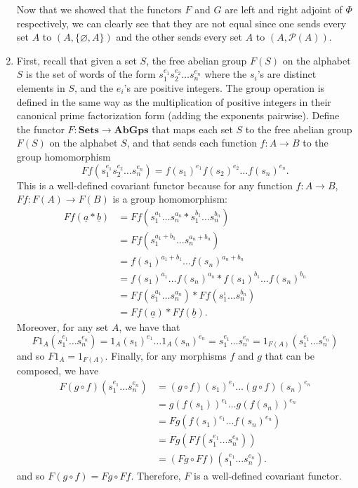 \documentclass{article}
\newcommand{\CatSets}{\textbf{Sets}}
\newcommand{\CatAbGps}{\textbf{AbGps}}
\begin{document}
\begin{enumerate}[label=(\alph*)]
    Now that we showed that the functors $F$ and $G$ are left and right adjoint of $\Phi$ respectively, we can clearly see that they are not equal since one sends every set $A$ to $(A, \{\varnothing, A\})$ and the other sends every set $A$ to $(A, \mathcal{P}(A))$.
    \item First, recall that given a set $S$, the free abelian group $F(S)$ on the alphabet $S$ is the set of words of the form $s_1^{e_1}s_2^{e_2}\dots s_n^{e_n}$ where the $s_i$'s are distinct elements in $S$, and the $e_i$'s are positive integers. The group operation is defined in the same way as the multiplication of positive integers in their canonical prime factorization form (adding the exponents pairwise). Define the functor $F : \CatSets \to \CatAbGps$ that maps each set $S$ to the free abelian group $F(S)$ on the alphabet $S$, and that sends each function $f : A \to B$ to the group homomorphism
    $$Ff(s_1^{e_1}s_2^{e_2}\dots s_n^{e_n}) = f(s_1)^{e_1}f(s_2)^{e_2}\dots f(s_n)^{e_n}.$$
    This is a well-defined covariant functor because for any function $f : A \to B$, $Ff : F(A) \to F(B)$ is a group homomorphism:
    \begin{align*}
        Ff(\underline{a}*\underline{b}) &= Ff(s_1^{a_1}\dots s_n^{a_n} * s_1^{b_1}\dots s_n^{b_n}) \\
        &= Ff(s_1^{a_1 + b_1}\dots s_n^{a_n + b_n}) \\
        &= f(s_1)^{a_1 + b_1}\dots f(s_n)^{a_n + b_n} \\
        &= f(s_1)^{a_1}\dots f(s_n)^{a_n} * f(s_1)^{b_1}\dots f(s_n)^{b_n} \\
        &= Ff(s_1^{a_1}\dots s_n^{a_n})*Ff(s_1^{ _1}\dots s_n^{b_n}) \\
        &= Ff(\underline{a})* Ff(\underline{b}).
    \end{align*}
    Moreover, for any set $A$, we have that
    $$F1_A(s_1^{e_1}\dots s_n^{e_n}) = 1_A(s_1)^{e_1}\dots 1_A(s_n)^{e_n} = s_1^{e_1}\dots s_n^{e_n} = 1_{F(A)}(s_1^{e_1}\dots s_n^{e_n})$$
    and so $F1_A = 1_{F(A)}$. Finally, for any morphisms $f$ and $g$ that can be composed, we have 
    \begin{align*}
        F(g \circ f)(s_1^{e_1}\dots s_n^{e_n}) &= (g \circ f)(s_1)^{e_1}\dots (g \circ f)(s_n)^{e_n} \\
        &= g(f(s_1))^{e_1}\dots g(f(s_n))^{e_n} \\
        &= Fg(f(s_1)^{e_1}\dots f(s_n)^{e_n}) \\
        &= Fg(Ff(s_1^{e_1}\dots s_n^{e_n})) \\
        &= (Fg \circ Ff)(s_1^{e_1}\dots s_n^{e_n}).
    \end{align*}
    and so $F(g \circ f) = Fg \circ Ff$. Therefore, $F$ is a well-defined covariant functor.


\end{enumerate}
\end{document}
